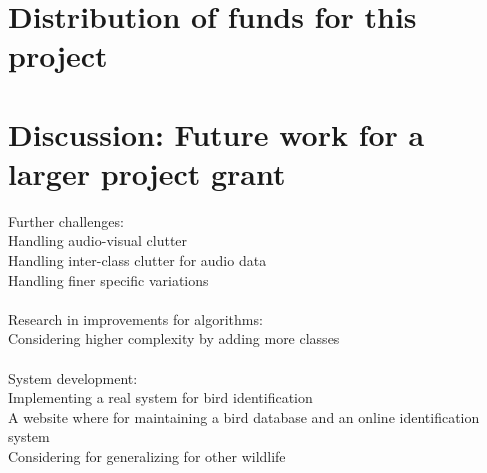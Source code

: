 \documentclass{article}
\begin{document}


\section{Distribution of funds for this project}

\section{Discussion: Future work for a larger project grant}

Further challenges:\\
Handling audio-visual clutter\\
Handling inter-class clutter for audio data\\
Handling finer specific variations \ \\ \ \\
Research in improvements for algorithms:\\
Considering higher complexity by adding more classes \ \\ \ \\
System development:\\
Implementing a real system for bird identification\\
A website where for maintaining a bird database and an online identification system\\
Considering for generalizing for other wildlife\ \\


\begin{thebibliography}{100}


\end{thebibliography}
    
\end{document}
